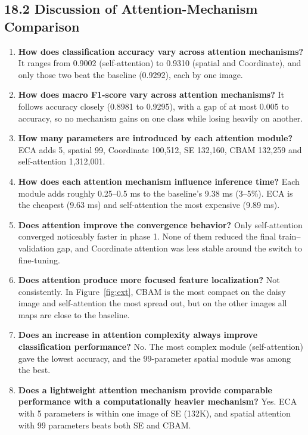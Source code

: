 \documentclass[10pt]{article}
\begin{document}
\subsection*{18.2 Discussion of Attention-Mechanism Comparison}

\begin{enumerate}
\item \textbf{How does classification accuracy vary across attention mechanisms?}
It ranges from 0.9002 (self-attention) to 0.9310 (spatial and Coordinate), and
only those two beat the baseline (0.9292), each by one image.

\item \textbf{How does macro F1-score vary across attention mechanisms?} It
follows accuracy closely (0.8981 to 0.9295), with a gap of at most 0.005 to
accuracy, so no mechanism gains on one class while losing heavily on another.

\item \textbf{How many parameters are introduced by each attention module?}
ECA adds 5, spatial 99, Coordinate 100{,}512, SE 132{,}160, CBAM 132{,}259 and
self-attention 1{,}312{,}001.

\item \textbf{How does each attention mechanism influence inference time?} Each
module adds roughly 0.25--0.5 ms to the baseline's 9.38 ms (3--5\%). ECA is the
cheapest (9.63 ms) and self-attention the most expensive (9.89 ms).

\item \textbf{Does attention improve the convergence behavior?} Only
self-attention converged noticeably faster in phase 1. None of them reduced the
final train--validation gap, and Coordinate attention was less stable around the
switch to fine-tuning.

\item \textbf{Does attention produce more focused feature localization?} Not
consistently. In Figure~\ref{fig:ext}, CBAM is the most compact on the daisy image
and self-attention the most spread out, but on the other images all maps are close
to the baseline.

\item \textbf{Does an increase in attention complexity always improve
classification performance?} No. The most complex module (self-attention) gave
the lowest accuracy, and the 99-parameter spatial module was among the best.

\item \textbf{Does a lightweight attention mechanism provide comparable
performance with a computationally heavier mechanism?} Yes. ECA with 5 parameters
is within one image of SE (132K), and spatial attention with 99 parameters beats
both SE and CBAM.
\end{enumerate}
\end{document}
